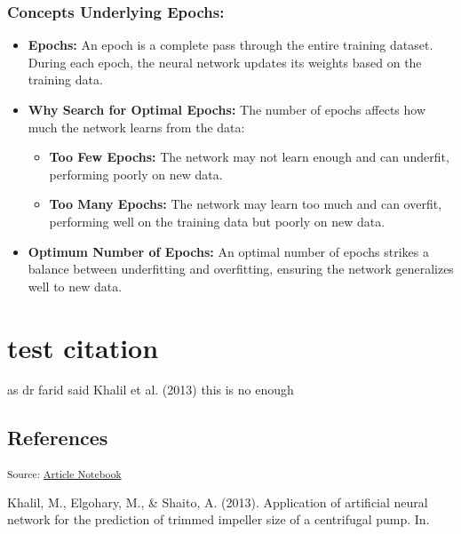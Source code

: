 \documentclass[
]{agujournal2019}
\providecommand{\tightlist}{%
  \setlength{\itemsep}{0pt}\setlength{\parskip}{0pt}}\usepackage{longtable,booktabs,array}
\newlength{\cslhangindent}
\newenvironment{CSLReferences}[2] %
 {\begin{list}{}{%
  \setlength{\itemindent}{0pt}
  \setlength{\leftmargin}{0pt}
  \setlength{\parsep}{0pt}
  \ifodd #1
   \setlength{\leftmargin}{\cslhangindent}
   \setlength{\itemindent}{-1\cslhangindent}
  \fi
  \setlength{\itemsep}{#2\baselineskip}}}
 {\end{list}}
\begin{document}
\subsubsection{Concepts Underlying
Epochs:}\label{concepts-underlying-epochs}

\begin{itemize}
\tightlist
\item
  \textbf{Epochs:} An epoch is a complete pass through the entire
  training dataset. During each epoch, the neural network updates its
  weights based on the training data.
\item
  \textbf{Why Search for Optimal Epochs:} The number of epochs affects
  how much the network learns from the data:

  \begin{itemize}
  \tightlist
  \item
    \textbf{Too Few Epochs:} The network may not learn enough and can
    underfit, performing poorly on new data.
  \item
    \textbf{Too Many Epochs:} The network may learn too much and can
    overfit, performing well on the training data but poorly on new
    data.
  \end{itemize}
\item
  \textbf{Optimum Number of Epochs:} An optimal number of epochs strikes
  a balance between underfitting and overfitting, ensuring the network
  generalizes well to new data.
\end{itemize}

\section{test citation}\label{test-citation}

as dr farid said Khalil et al. (2013) this is no enough

\subsection*{References}\label{references}

\vspace{1em}

\textsubscript{Source:
\href{https://MohammedTwheed.github.io/trimming-draft-01/index.qmd.html}{Article
Notebook}}

\label{refs}
\begin{CSLReferences}{1}{0}
Khalil, M., Elgohary, M., \& Shaito, A. (2013). Application of
artificial neural network for the prediction of trimmed impeller size of
a centrifugal pump. In.

\end{CSLReferences}
\end{document}
